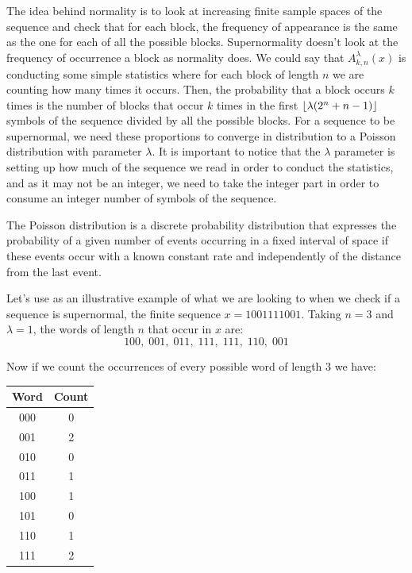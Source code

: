 \documentclass[11pt,a4paper]{tesis}
\DeclarePairedDelimiter{\floor}{\lfloor}{\rfloor}
\begin{document}
The idea behind normality is to look at increasing finite sample spaces of the sequence and check that for each block, the frequency of appearance is the same as the one for each of all the possible blocks.
Supernormality doesn't look at the frequency of occurrence a block as normality does. We could say that $A^\lambda_{k,n}(x)$ is conducting some simple statistics where for each block of length $n$ we are counting how many times it occurs. 
 Then, the probability that a block occurs $k$ times is the number of blocks that occur $k$ times in the first $\floor{\lambda(2^n + n - 1)}$ symbols of the sequence divided by all the possible blocks.
For a sequence to be supernormal, we need these proportions to converge in distribution to a Poisson distribution with parameter $\lambda$. 
It is important to notice that the $\lambda$ parameter is setting up how much of the sequence we read in order to conduct the statistics, and as it may not be an integer, we need to take the integer part in order to consume an integer number of symbols of the sequence.

The Poisson distribution is a discrete probability distribution that expresses the probability of a given number of events occurring in a fixed interval of space if these events occur with a known constant rate and independently of the distance from the last event.


Let's use as an illustrative example of what we are looking to when we check if a sequence is supernormal, the finite sequence $x = 1001111001$. Taking $n=3$ and $\lambda = 1$, the words of length $n$ that occur in $x$ are:
$$100, \; 001, \; 011,\; 111,\; 111,\; 110,\; 001$$

Now if we count the occurrences of every possible word of length $3$ we have:

\begin{center}
    \begin{tabular}{|c | c|} 
    \hline
    Word & Count \\ [0.5ex] 
    \hline
    000 & 0 \\ 
    \hline
    001 & 2 \\ 
    \hline
    010 & 0 \\ 
    \hline
    011 & 1 \\ 
    \hline
    100 & 1 \\ 
    \hline
    101 & 0 \\ 
    \hline
    110 & 1 \\ 
    \hline
    111 & 2 \\ 
    \hline
   \end{tabular}
\end{center}
\end{document}
